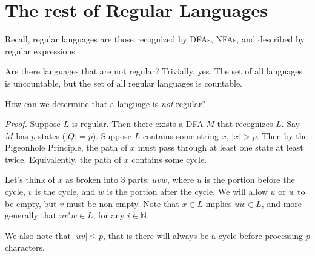





\section*{The rest of Regular Languages}

Recall, regular languages are those recognized by DFAs, NFAs, and described by regular expressions

Are there languages that are not regular?  Trivially, yes.  The set of all languages is uncountable, but the set of all regular languages is countable.

How can we determine that a language is \textit{not} regular?






\begin{proof}
	Suppose $L$ is regular.  Then there exists a DFA $M$ that recognizes $L$.  Say $M$ has $p$ states ($|Q|=p$).  Suppose $L$ contains some string $x$, $|x| > p$.  Then by the Pigeonhole Principle, the path of $x$ must pass through at least one state at least twice.  Equivalently, the path of $x$ contains some cycle.  
	
	Let's think of $x$ as broken into 3 parts: $uvw$, where $u$ is the portion before the cycle, $v$ is the cycle, and $w$ is the portion after the cycle.  We will allow $u$ or $w$ to be empty, but $v$ must be non-empty.  Note that $x\in L $ implies $ uw \in L$, and more generally that $uv^iw\in L$, for any $i\in \mathbb{N}$.  
	
	We also note that $|uv|\leq p$, that is there will always be a cycle before processing $p$ characters.
	
\end{proof}

